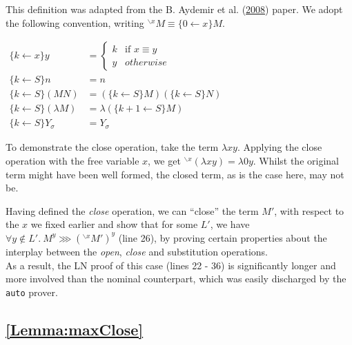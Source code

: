 \documentclass[a4paper, 12pt, twoside]{style/ociamthesis}
\theoremstyle{plain}
\theoremstyle{definition}
\newtheorem{Definition}{Definition}[chapter]
\newtheorem{Example}{Example}[chapter]
\theoremstyle{remark}
\newcommand{\cls}{{}^{\backslash x}}
\renewenvironment{Example}{\begin{OldExample}\begin{mdframed}[style=example, linecolor=yellow]}{\end{mdframed}\end{OldExample}}
\renewenvironment{Definition}{\begin{OldDefinition}\begin{mdframed}[style=example, linecolor=cyan]}{\end{mdframed}\end{OldDefinition}}
\begin{document}
\begin{Definition}[Close operation]

This definition was adapted from the B. Aydemir et al.
(\protect\hyperlink{ref-aydemir08}{2008}) paper. We adopt the following
convention, writing \(\cls M \equiv \{0 \leftarrow x\}M\).

\begin{center}
$\begin{aligned}
\{k \leftarrow x\}y &= \begin{cases}
k & \text{if }x \equiv y\\
y & otherwise
\end{cases}\\
\{k \leftarrow S\}n &= n\\
\{k \leftarrow S\}(MN) &= (\{k \leftarrow S\}M)(\{k \leftarrow S\}N)\\
\{k \leftarrow S\}(\lambda M) &= \lambda (\{k+1 \leftarrow S\}M)\\
\{k \leftarrow S\}Y_\sigma &= Y_\sigma
\end{aligned}$
\end{center}

\end{Definition}

\begin{Example}

To demonstrate the close operation, take the term \(\lambda xy\).
Applying the close operation with the free variable \(x\), we get
\(\cls (\lambda xy) = \lambda 0y\). Whilst the original term might have
been well formed, the closed term, as is the case here, may not be.

\end{Example}

Having defined the \emph{close} operation, we can ``close'' the term
\(M'\), with respect to the \(x\) we fixed earlier and show that for
some \(L'\), we have \(\forall y \not\in L'.\ M^y \ggg (\cls M')^y\)
(line 26), by proving certain properties about the interplay between the
\emph{open}, \emph{close} and substitution operations.\\
As a result, the LN proof of this case (lines 22 - 36) is significantly
longer and more involved than the nominal counterpart, which was easily
discharged by the \texttt{auto} prover.

\subsection{\texorpdfstring{\cref{Lemma:maxClose}}{}}\label{section-1}
\end{document}

